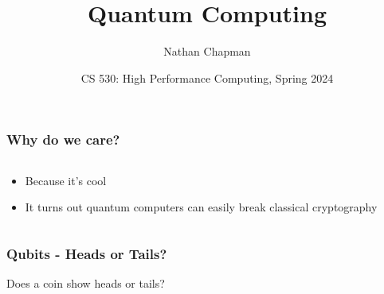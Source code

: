 \documentclass[aspectratio=169]{beamer}
\title[Quantum Computing]{Quantum Computing}
\author[Chapman, Nathan]{Nathan Chapman}
\institute[CWU]
{
  Faculty of Physics\\
  Central Washington University
}
\date[HPC 2024]{CS 530: High Performance Computing, Spring 2024}
\begin{document}
\frame{\titlepage}

\begin{frame}
    \frametitle{Why do we care?}
    \begin{columns}
        \begin{column}{0.5\textwidth}
            \begin{itemize}
                \item Because it's cool
                \item It turns out quantum computers can easily break classical cryptography
            \end{itemize}
        \end{column}
        \begin{column}{0.5\textwidth}
            
        \end{column}
    \end{columns}
\end{frame}

\begin{frame}
    \frametitle{Qubits - Heads or Tails?}

    \centering
    Does a coin show heads or tails?

\end{frame}
\end{document}
